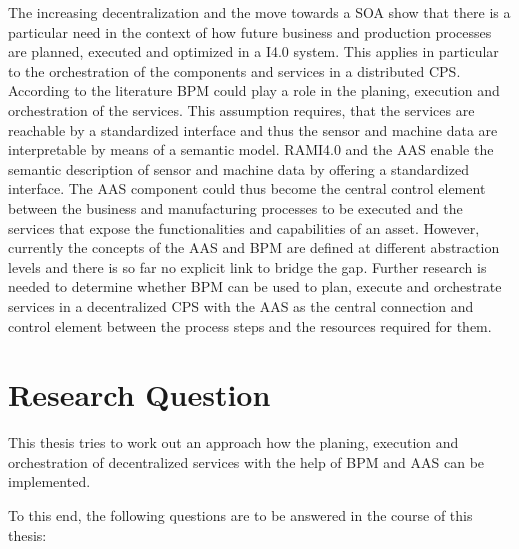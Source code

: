 The increasing decentralization and the move towards a \ac{SOA} show that there is a particular need in the context of how future business and production processes are planned, executed and optimized in a \ac{I4.0} system. This applies in particular to the orchestration of the components and services in a distributed \ac{CPS}. According to the literature \ac{BPM} could play a role in the planing, execution and orchestration of the services. This assumption requires, that the services are reachable by a standardized interface and thus the sensor and machine data are interpretable by means of a semantic model. \ac{RAMI4.0} and the \ac{AAS} enable the semantic description of sensor and machine data by offering a standardized interface. The \ac{AAS} component could thus become the central control element between the business and manufacturing processes to be executed and the services that expose the functionalities and capabilities of an asset. However, currently the concepts of the \ac{AAS} and \ac{BPM} are defined at different abstraction levels and there is so far no explicit link to bridge the gap. Further research is needed to determine whether BPM can be used to plan, execute and orchestrate services in a decentralized \ac{CPS} with the \ac{AAS} as the central connection and control element between the process steps and the resources required for them. 

\section{Research Question}
This thesis tries to work out an approach how the planing, execution and orchestration of decentralized services with the help of \ac{BPM} and \ac{AAS} can be implemented.

To this end, the following questions are to be answered in the course of this thesis:

